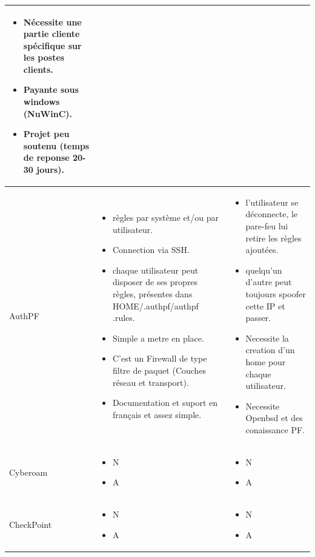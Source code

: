 \documentclass[12pt]{report}
\begin{document}
\begin{itemize}
\begin{tabular}{|p{3cm}|p{5cm}|p{5cm}|}
\begin{itemize}
		\item Nécessite une partie cliente spécifique sur les postes clients.
		\item Payante sous windows (NuWinC).
		\item Projet peu soutenu (temps de reponse 20-30 jours).
	\end{itemize} \\
  \hline
	AuthPF&
	\begin{itemize}
		\item règles par système et/ou par utilisateur.
		\item Connection via SSH.
		\item chaque utilisateur peut disposer de ses propres règles, présentes dans HOME/.authpf/authpf .rules.
		\item Simple a metre en place.
		\item  C'est un Firewall de type filtre de paquet (Couches réseau et transport).
		\item Documentation et suport en français et assez simple.
	\end{itemize}&
	\begin{itemize}
		\item l'utilisateur se déconnecte, le pare-feu lui retire les règles ajoutées.
		\item quelqu'un d'autre peut toujours spoofer cette IP et passer.
		\item Necessite la creation d'un home pour chaque utilisateur.
		\item Necessite Openbsd et des conaissance PF.
	\end{itemize} \\
  \hline 
	Cyberoam&
	\begin{itemize}
		\item N
		\item A 
	\end{itemize}&
	\begin{itemize}
		\item N
		\item A
	\end{itemize} \\
  \hline 
	CheckPoint&
	\begin{itemize}
		\item N
		\item A
	\end{itemize}&
	\begin{itemize}
		\item N
		\item A
	\end{itemize} \\
\end{tabular} 

\end{itemize}
\end{document}
